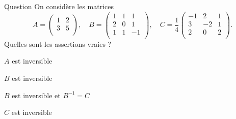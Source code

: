 \begin{multi}[multiple,feedback=
{On vérifie que \(A\) et \(B\) sont inversibles,  que \(\displaystyle B^{-1} = \frac{1}{4}\left(\begin{array}{rcc}-1&2&1\\ 3&-2&1\\ 2&0&-2\\ \end{array}\right) \neq C\) et que \(C\) n'est pas inversible.
}]{Question}
On considère les matrices 
\[A = \left(\begin{array}{rc}
1&2\\3&5\\ \end{array}\right),\quad B = \left(\begin{array}{rcc}
1&1&1\\2&0&1\\ 1&1&-1\\ \end{array}\right),\quad
C = \frac{1}{4}\left(\begin{array}{rcc}
-1&2&1\\3&-2&1\\ 2&0&2\\ \end{array}\right).\]
Quelles sont les assertions vraies ?

    \item* \(A\) est inversible
    \item* \(B\) est inversible
    \item \(B\) est inversible et \(B^{-1} = C\)
    \item \(C\) est inversible
\end{multi}


